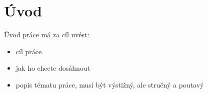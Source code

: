 \section*{Úvod}
Úvod práce má za cíl uvést:
\begin{itemize}
    \item cíl práce
    \item jak ho chcete dosáhnout
    \item popis tématu práce, musí být výstižný, ale stručný a poutavý
\end{itemize}



\newpage
